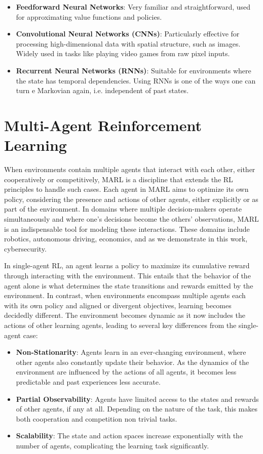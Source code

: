 \begin{itemize}
    \item \textbf{Feedforward Neural Networks}: Very familiar and straightforward, used for approximating value functions and policies.
    \item \textbf{Convolutional Neural Networks (CNNs)}: Particularly effective for processing high-dimensional data with spatial structure, such as images. Widely used in tasks like playing video games from raw pixel inputs.
    \item \textbf{Recurrent Neural Networks (RNNs)}: Suitable for environments where the state has temporal dependencies. Using RNNs is one of the ways one can turn e Markovian again, i.e. independent of past states.
\end{itemize}

\section{Multi-Agent Reinforcement Learning}

When environments contain multiple agents that interact with each other, either cooperatively or competitively, \gls{MARL} is a discipline that extends the \gls{RL} principles to handle such cases.
Each agent in \gls{MARL} aims to optimize its own policy, considering the presence and actions of other agents, either explicitly or as part of the environment.
In domains where multiple decision-makers operate simultaneously and where one's decisions become the others' observations, \gls{MARL} is an indispensable tool for modeling these interactions.
These domains include robotics, autonomous driving, economics, and as we demonstrate in this work, cybersecurity.

In single-agent \gls{RL}, an agent learns a policy to maximize its cumulative reward through interacting with the environment.
This entails that the behavior of the agent alone is what determines the state transitions and rewards emitted by the environment.
In contrast, when environments encompass multiple agents each with its own policy and aligned or divergent objectives, learning becomes decidedly different.
The environment becomes dynamic as it now includes the actions of other learning agents, leading to several key differences from the single-agent case:

\begin{itemize}
    \item \textbf{Non-Stationarity}: Agents learn in an ever-changing environment, where other agents also constantly update their behavior. As the dynamics of the environment are influenced by the actions of all agents, it becomes less predictable and past experiences less accurate.
    \item \textbf{Partial Observability}: Agents have limited access to the states and rewards of other agents, if any at all. Depending on the nature of the task, this makes both cooperation and competition non trivial tasks.
    \item \textbf{Scalability}: The state and action spaces increase exponentially with the number of agents, complicating the learning task significantly.
\end{itemize}

